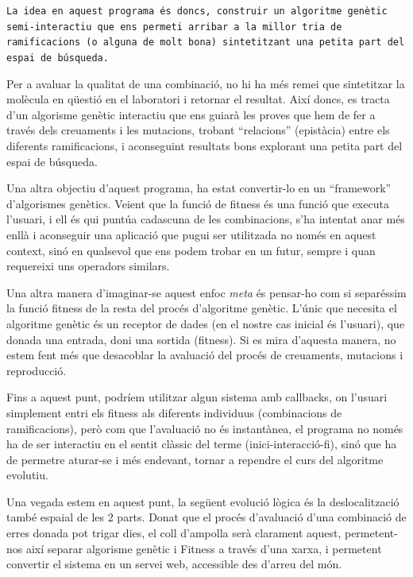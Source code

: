 	\texttt{La idea en aquest programa és doncs, construir un algoritme genètic
	semi-interactiu que ens permeti arribar a la millor tria de ramificacions (o
	alguna de molt bona) sintetitzant una petita part del espai de búsqueda.}

	Per a avaluar la qualitat de una combinació, no hi ha més remei que
	sintetitzar la molècula en qüestió en el laboratori i retornar el resultat.
	Així doncs, es tracta d'un algorisme genètic interactiu 
	que ens guiarà les proves que hem de fer a través dels creuaments i les
	mutacions, trobant ``relacions'' (epistàcia) entre els diferents
	ramificacions, i aconseguint resultats bons explorant una petita part del
	espai de búsqueda.

	Una altra objectiu d'aquest programa, ha estat convertir-lo en un
	``framework'' d'algorismes genètics.  Veient que la funció de fitness és una
	funció que executa l'usuari, i ell és qui puntúa cadascuna de les
	combinacions, s'ha intentat anar més enllà i aconseguir una aplicació que
	pugui ser utilitzada no només en aquest context, sinó en qualsevol que ens
	podem trobar en un futur, sempre i quan requereixi uns operadors similars.

	Una altra manera d'imaginar-se aquest enfoc \emph{meta} és pensar-ho com si
	separéssim la funció fitness de la resta del procés d'algoritme genètic.
	L'únic que necesita el algoritme genètic és un receptor de dades (en el
	nostre cas inicial és l'usuari), que donada una entrada, doni una
	sortida (fitness).  Si es mira d'aquesta manera, no estem fent més que
	desacoblar la avaluació del procés de creuaments, mutacions i reproducció.

	Fins a aquest punt, podríem utilitzar algun sistema amb callbacks, on
	l'usuari simplement entri els fitness als diferents individuus (combinacions
	de ramificacions), però com que l'avaluació no és instantànea, el programa no
	només ha de ser interactiu en el sentit clàssic del terme (inici-interacció-fi),
	sinó que ha de permetre aturar-se i més endevant, tornar a rependre el curs
	del algoritme evolutiu. 

	Una vegada estem en aquest punt, la següent evolució lògica és la
	deslocalització també espaial de les 2 parts.  Donat que el procés
	d'avaluació d'una combinació de erres donada pot trigar dies, el coll
	d'ampolla serà clarament aquest, permetent-nos així separar algorisme
	genètic i Fitness a través d'una xarxa, i permetent convertir el sistema en
	un servei web, accessible des d'arreu del món.

